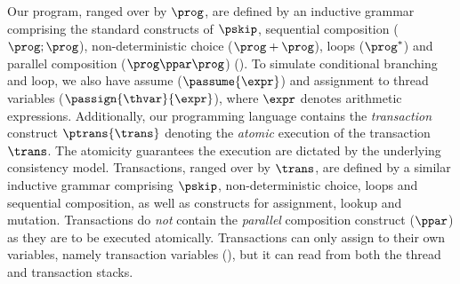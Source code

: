Our program, ranged over by $\prog$, are defined by an inductive grammar comprising the standard constructs of $\pskip$, sequential composition ($\prog; \prog$), non-deterministic choice ($\prog+\prog$), loops ($\prog^*$) and  parallel composition ($\prog \ppar \prog$) ().
To simulate conditional branching and loop, we also have assume (\( \passume{\expr}\)) and assignment to thread variables (\( \passign{\thvar}{\expr} \)), where \( \expr \) denotes arithmetic expressions.
Additionally, our programming language contains the \emph{transaction} construct $\ptrans{\trans}$ denoting the \emph{atomic} execution of the transaction $\trans$. 
The atomicity guarantees the execution are dictated by the underlying consistency model.
Transactions, ranged over by $\trans$, are defined by a similar inductive grammar comprising $\pskip$, non-deterministic choice, loops and sequential composition, as well as constructs for assignment, lookup and mutation. 
Transactions do \emph{not} contain the \emph{parallel} composition construct ($\ppar$) as they are to be executed atomically.
Transactions can only assign to their own variables, namely transaction variables (), but it can read from both the thread and transaction stacks.

